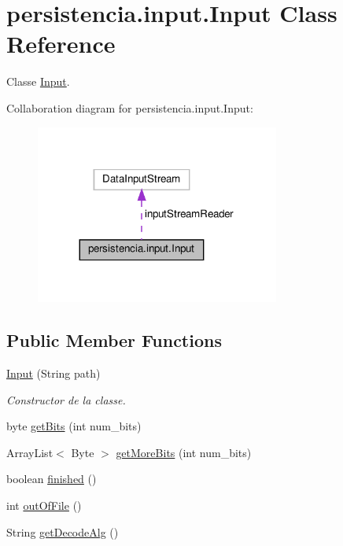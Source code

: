 \hypertarget{classpersistencia_1_1input_1_1Input}{}\section{persistencia.\+input.\+Input Class Reference}
\label{classpersistencia_1_1input_1_1Input}


Classe \hyperlink{classpersistencia_1_1input_1_1Input}{Input}.  




Collaboration diagram for persistencia.\+input.\+Input\+:\nopagebreak
\begin{figure}[H]
\begin{center}
\leavevmode
\includegraphics[width=227pt]{classpersistencia_1_1input_1_1Input__coll__graph}
\end{center}
\end{figure}
\subsection*{Public Member Functions}
\begin{DoxyCompactItemize}
\item 
\hyperlink{classpersistencia_1_1input_1_1Input_a9b30ef8d489a1fc5b4aa04a14474349a}{Input} (String path)
\begin{DoxyCompactList}\small\item\em Constructor de la classe. \end{DoxyCompactList}\item 
byte \hyperlink{classpersistencia_1_1input_1_1Input_a3fa5a378b2155a3022a4a4ef38d63a8e}{get\+Bits} (int num\+\_\+bits)
\item 
Array\+List$<$ Byte $>$ \hyperlink{classpersistencia_1_1input_1_1Input_a81e96a5ac3ca41b5001ffff9f9acc76a}{get\+More\+Bits} (int num\+\_\+bits)
\item 
boolean \hyperlink{classpersistencia_1_1input_1_1Input_af607cad1726ef15cf8e970dcbee74b68}{finished} ()
\item 
int \hyperlink{classpersistencia_1_1input_1_1Input_a3f0fc057e91430b81f5f2c92f91b8ed7}{out\+Of\+File} ()
\item 
String \hyperlink{classpersistencia_1_1input_1_1Input_a95e2068bd17e415f0487f8193f066160}{get\+Decode\+Alg} ()
\end{DoxyCompactItemize}
